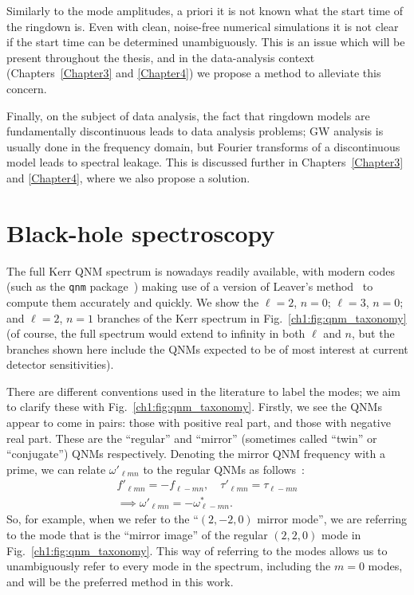 Similarly to the mode amplitudes, a priori it is not known what the start time of the ringdown is.
Even with clean, noise-free numerical simulations it is not clear if the start time can be determined unambiguously.
This is an issue which will be present throughout the thesis, and in the data-analysis context (Chapters~\ref{Chapter3} and \ref{Chapter4}) we propose a method to alleviate this concern.

Finally, on the subject of data analysis, the fact that ringdown models are fundamentally discontinuous leads to data analysis problems; GW analysis is usually done in the frequency domain, but Fourier transforms of a discontinuous model leads to spectral leakage.
This is discussed further in Chapters~\ref{Chapter3} and \ref{Chapter4}, where we also propose a solution.

\section{Black-hole spectroscopy}
\label{ch1:sec:bh_spectroscopy}

The full Kerr QNM spectrum is nowadays readily available, with modern codes (such as the \texttt{qnm} package~\cite{Stein:2019mop}) making use of a version of Leaver's method~\cite{Leaver:1985ax} to compute them accurately and quickly.
We show the $\ell = 2$, $n = 0$; $\ell = 3$, $n = 0$; and $\ell = 2$, $n = 1$ branches of the Kerr spectrum in Fig.~\ref{ch1:fig:qnm_taxonomy} (of course, the full spectrum would extend to infinity in both $\ell$ and $n$, but the branches shown here include the QNMs expected to be of most interest at current detector sensitivities).  

There are different conventions used in the literature to label the modes; we aim to clarify these with Fig.~\ref{ch1:fig:qnm_taxonomy}.
Firstly, we see the QNMs appear to come in pairs: those with positive real part, and those with negative real part.
These are the ``regular'' and ``mirror'' (sometimes called ``twin'' or ``conjugate'') QNMs respectively.
Denoting the mirror QNM frequency with a prime, we can relate $\omega'_{\ell m n}$ to the regular QNMs as follows~\cite{Berti:2005ys}:
\begin{gather}
    f'_{\ell m n} = -f_{\ell -m n}, \quad \tau'_{\ell m n} = \tau_{\ell -m n} \nonumber \\
    \implies \omega'_{\ell m n} = - \omega_{\ell -mn}^*.
    \label{ch1:eq:mirror}
\end{gather}
So, for example, when we refer to the ``$(2,-2,0)$ mirror mode'', we are referring to the mode that is the ``mirror image'' of the regular $(2,2,0)$ mode in Fig.~\ref{ch1:fig:qnm_taxonomy}.
This way of referring to the modes allows us to unambiguously refer to every mode in the spectrum, including the $m=0$ modes, and will be the preferred method in this work.

